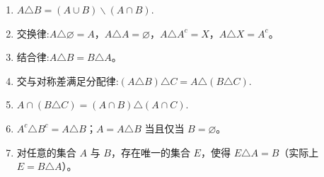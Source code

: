 \documentclass[../../main.tex]{subfiles}%
\begin{document}
\begin{theorem}[集合对称差的性质]\label{theorem:集合对称差的性质}
\begin{enumerate}[(1)]
\item \(A \triangle B = \left( A\cup B \right) \backslash \left( A\cap B \right) .\)

\item 交换律:\( A \triangle \varnothing = A \)，\( A \triangle A = \varnothing \)，\( A \triangle A^c = X \)，\( A \triangle X = A^c \)。

\item 结合律:\( A \triangle B = B \triangle A \)。

\item 交与对称差满足分配律:\(
(A \triangle B) \triangle C = A \triangle (B \triangle C).
\)

\item $A \cap (B \triangle C) = (A \cap B) \triangle (A \cap C).$

\item \( A^c \triangle B^c = A \triangle B \)；\( A = A \triangle B \) 当且仅当 \( B = \varnothing \)。

\item 对任意的集合 \( A \) 与 \( B \)，存在唯一的集合 \( E \)，使得 \( E \triangle A = B \)（实际上 \( E = B \triangle A \)）。
\end{enumerate}
\end{theorem}
\end{document}
